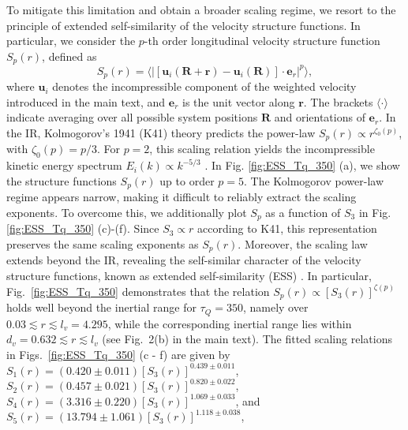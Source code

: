 \documentclass[aps,prl,twocolumn,showpacs,notitlepage,floatfix,superscriptaddress]{revtex4-1}
\begin{document}
To mitigate this limitation and obtain a broader scaling regime, we resort to the principle of extended self-similarity of the velocity structure functions.
In particular, we consider the $p$-th order longitudinal velocity structure function $S_p \left( r \right)$, defined as 
\begin{equation}
S_{p}(r) = \Big\langle \big\vert[\boldsymbol{u}_{i}(\boldsymbol{R}+\boldsymbol{r}) - \boldsymbol{u}_{i}(\boldsymbol{R})]\cdot 
\boldsymbol{e}_r 
\big\vert^{p} \Big\rangle,
\end{equation}
where $\boldsymbol{u}_{i}$ denotes the incompressible component of the weighted velocity introduced in the main text, and 
$\boldsymbol{e}_r$ 
is the unit vector along $\boldsymbol{r}$. The brackets $\langle \cdot \rangle$ indicate averaging over all possible system positions $\boldsymbol{R}$ and orientations of 
$\boldsymbol{e}_r$. 
In the IR, Kolmogorov's 1941 (K41) theory predicts the power-law
\(
S_p(r) \propto r^{
\zeta_0 \left( p \right)
}
\), with $
\zeta_0 \left( p \right)
=p/3
$. For \(p = 2\), this scaling relation yields the incompressible kinetic energy spectrum \(E_i(k) \propto k^{-5/3}\) \cite{Kolmogorov41,Benzi1993,Dubrulle1994,Frisch1995}.
In Fig. \ref{fig:ESS_Tq_350} (a), we show the structure functions $S_{p}(r)$ up to order $p=5$. The Kolmogorov power-law regime appears narrow, making it difficult to reliably extract the scaling exponents. To overcome this, we additionally plot $S_{p}$ as a function of $S_{3}$ in Fig. \ref{fig:ESS_Tq_350} (c)-(f). Since $S_{3}\propto r$ according to K41, this representation preserves the same scaling exponents as $S_{p}(r)$.
Moreover, the scaling law extends beyond the IR, revealing the self-similar character of the velocity structure functions, known as extended self-similarity (ESS) \cite{Benzi1993}. 
In particular, Fig.~\ref{fig:ESS_Tq_350} demonstrates that the relation $S_p(r) \propto [S_3(r)]^{\zeta(p)}$ holds well beyond the inertial range for $\tau_Q = 350$, namely over $0.03 \lesssim r \lesssim l_v = 4.295$, while the corresponding inertial range lies within $d_v = 0.632 \lesssim r \lesssim l_v$ (see Fig.~2(b) in the main text). The fitted scaling relations in Figs.~\ref{fig:ESS_Tq_350} (c - f) are given by
$S_1(r) = \left( 0.420 \pm 0.011 \right) \left\lbrack S_3(r) \right\rbrack^{0.439 \pm 0.011}$, 
$S_2(r) = \left( 0.457 \pm 0.021 \right) \left\lbrack S_3(r) \right\rbrack^{0.820 \pm 0.022}$, 
$S_4(r) = \left( 3.316 \pm 0.220 \right) \left\lbrack S_3(r) \right\rbrack^{1.069 \pm 0.033}$, 
and
$S_5(r) = \left( 13.794 \pm 1.061 \right) \left\lbrack S_3(r) \right\rbrack^{1.118 \pm 0.038}$, 
\end{document}
